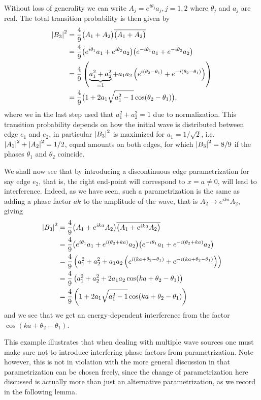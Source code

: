 \begin{example}
  Without loss of generality we can write $A_j = e^{i\theta_j}a_j, j=1,2$ where $\theta_j$ and $a_j$ are real. The total transition probability is then given by
  \begin{align*}
    \left\lvert B_3\right\rvert^2 &=
    \frac{4}{9}\big(A_1+A_2\big)\overline{\big(A_1+A_2\big)} \\ &=
    \frac{4}{9}\big(e^{i\theta_1}a_1+e^{i\theta_2}a_2\big)\big(e^{-i\theta_1}a_1+e^{-i\theta_2}a_2\big) \\ &=
    \frac{4}{9}\left(\underbrace{a_1^2+a_2^2}_{=1}+a_1a_2\left(e^{i(\theta_2-\theta_1)}+e^{-i(\theta_2-\theta_1)}\right)\right) \\ &=
    \frac{4}{9}\big(1+2a_1\sqrt{a_1^2-1}\cos (\theta_2-\theta_1)\big),
  \end{align*}
  where we in the last step used that $a_1^2+a_2^2=1$ due to normalization.
  This transition probability depends on how the initial wave is distributed between edge $e_1$ and $e_2$, in particular $\left\lvert B_3\right\rvert^2$ is maximized for $a_1=1/\sqrt{2}$, i.e.\ $\left\lvert A_1\right\rvert^2+\left\lvert A_2\right\rvert^2=1/2$, equal amounts on both edges, for which $\left\lvert B_3\right\rvert^2=8/9$ if the phases $\theta_1$ and $\theta_2$ coincide.

  We shall now see that by introducing a discontinuous edge parametrization for say edge $e_2$, that is, the right end-point will correspond to $x = a \ne 0$, will lead to interference. Indeed, as we have seen, such a parametrization is the same as adding a phase factor $ak$ to the amplitude of the wave, that is $A_2 \to e^{ika}A_2$, giving
  \begin{align*}
    \left\lvert B_3\right\rvert^2 &=
    \frac{4}{9}\big(A_1+e^{ika}A_2\big)\overline{\big(A_1+e^{ika}A_2\big)} \\ &=
    \frac{4}{9}\big(e^{i\theta_1}a_1+e^{i(\theta_2+ka)}a_2\big)\big(e^{-i\theta_1}a_1+e^{-i(\theta_2+ka)}a_2\big) \\ &=
    \frac{4}{9}\left(a_1^2+a_2^2+a_1a_2\left(e^{i(ka+\theta_2-\theta_1)}+e^{-i(ka+\theta_2-\theta_1)}\right)\right) \\ &=
    \frac{4}{9}\left(a_1^2+a_2^2+2a_1a_2\cos(ka+\theta_2-\theta_1)\right) \\ &=
    \frac{4}{9}\left(1+2a_1\sqrt{a_1^2-1}\cos(ka+\theta_2-\theta_1)\right)
  \end{align*}
  and we see that we get an energy-dependent interference from the factor $\cos(ka+\theta_2-\theta_1)$.

  This example illustrates that when dealing with multiple wave sources one must make sure not to introduce interfering phase factors from parametrization. Note however, this is not in violation with the more general discussion in that parametrization can be chosen freely, since the change of parametrization here discussed is actually more than just an alternative parametrization, as we record in the following lemma.
\end{example}

